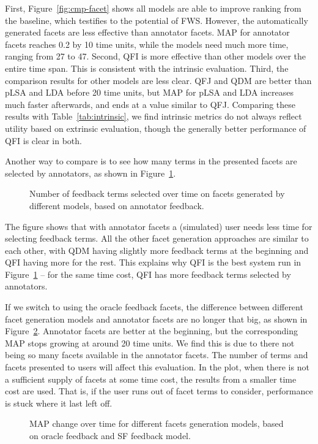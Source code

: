 First, Figure~\ref{fig:cmp-facet} shows all models are able to improve ranking from the baseline, which testifies to the potential of FWS. However, the automatically generated facets are less effective than annotator facets. MAP for annotator facets reaches 0.2 by 10 time units, while the models need much more time, ranging from 27 to 47. Second, QFI is more effective than other models over the entire time span. This is consistent with the intrinsic evaluation. Third, the comparison results for other models are less clear. QFJ and QDM are better than pLSA and LDA before 20 time units, but MAP for pLSA and LDA increases much faster afterwards, and ends at a value similar to QFJ. Comparing these results with Table~\ref{tab:intrinsic}, we find intrinsic metrics do not always reflect utility based on extrinsic evaluation, though the generally better performance of QFI is clear in both.

Another way to compare is to see how many terms in the presented facets are selected by annotators, as shown in Figure~\ref{fig:cmp-facet-term}.
\begin{figure}[H]
\centering
{}
\caption{Number of feedback terms selected over time on facets generated by different models, based on annotator feedback.}
\label{fig:cmp-facet-term}
\end{figure}
The figure shows that with annotator facets a (simulated) user needs less time for selecting feedback terms. All the other facet generation approaches are similar to each other, with QDM having slightly more feedback terms at the beginning and QFI having more for the rest. This explains why QFI is the best system run in Figure~\ref{fig:cmp-facet-term} -- for the same time cost, QFI has more feedback terms selected by annotators.

If we switch to using the oracle feedback facets, the difference between different facet generation models and annotator facets are no longer that big, as shown in Figure~\ref{fig:cmp-facet-oracle}. Annotator facets are better at the beginning, but the corresponding MAP stops growing at around 20 time units. We find this is due to there not being so many facets available in the annotator facets. The number of terms and facets presented to users will affect this evaluation. In the plot, when there is not a sufficient supply of facets at some time cost, the results from a smaller time cost are used. That is, if the user runs out of facet terms to consider, performance is stuck where it last left off. 
\begin{figure}[H]
\centering
{}
\caption{MAP change over time for different facets generation models, based on oracle feedback and SF feedback model.}
\label{fig:cmp-facet-oracle}
\end{figure}

